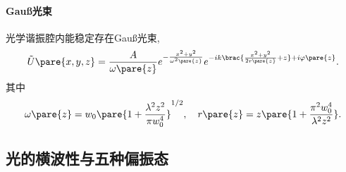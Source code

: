 \documentclass{ctexart}
\begin{document}
\paragraph{Gau\ss 光束} %
\label{par:gauss_光束}

光学谐振腔内能稳定存在Gau\ss 光束,
\[ \tilde{U}\pare{x,y,z} = \frac{A}{\omega\pare{z}} e^{-\frac{x^2+y^2}{\omega^2\pare{z}}} e^{-ik\brac{\frac{x^2+y^2}{2r\pare{z}}+z}+i\varphi\pare{z}}. \]
其中
\[ \omega\pare{z} = w_0 \pare{1+\frac{\lambda^2 z^2}{\pi w_0^4}}^{1/2},\quad r\pare{z} = z\pare{1+\frac{\pi^2w_0^4}{\lambda^2 z^2}}. \]



\subsection{光的横波性与五种偏振态} %
\label{sub:光的横波性与五种偏振态}
\end{document}
